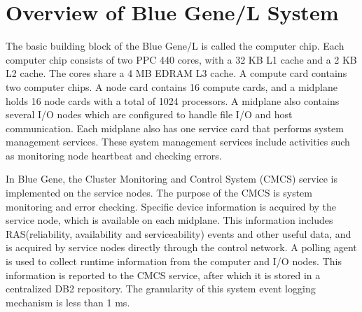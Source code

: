 \chapter{Overview of Blue Gene/L System}
The basic building block of the Blue Gene/L is called the computer chip. Each computer chip consists of two PPC 440 cores, with a 32 KB L1 cache and a 2 KB L2 cache. The cores share a 4 MB EDRAM L3 cache. A compute card contains two computer chips. A node card contains 16 compute cards, and a midplane holds 16 node cards with a total of 1024 processors. A midplane also contains several I/O nodes which are configured to handle file I/O and host communication. Each midplane also has one service card that performs system management services. These system management services include activities such as monitoring node heartbeat and checking errors. 

In Blue Gene, the Cluster Monitoring and Control System (CMCS) service is implemented on the service nodes. The purpose of the CMCS is system monitoring and error checking. Specific device information is acquired by the service node, which is available on each midplane. This information includes RAS(reliability, availability and serviceability) events and other useful data, and is acquired by service nodes directly through the control network. A polling agent is used to collect runtime information from the computer and I/O nodes. This information is reported to the CMCS service, after which it is stored in a centralized DB2 repository. The granularity of this system event logging mechanism is less than 1 ms.
